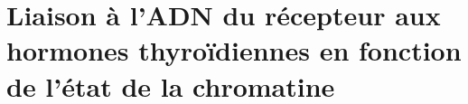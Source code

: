 \chapter{Liaison à l'ADN du récepteur aux hormones thyroïdiennes en fonction de l'état de la chromatine}
